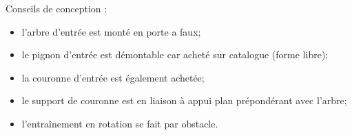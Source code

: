 \documentclass[11pt,oneside]{article}
\begin{document}
Conseils de conception : 
\begin{itemize}
\item l'arbre d'entrée est monté en porte a faux;
\item le pignon d'entrée est démontable car acheté sur catalogue (forme libre);
\item la couronne d'entrée est également achetée;
\item le support de couronne est en liaison à appui plan prépondérant avec l'arbre;
\item l'entraînement en rotation se fait par obstacle.
\end{itemize}
\end{document}
